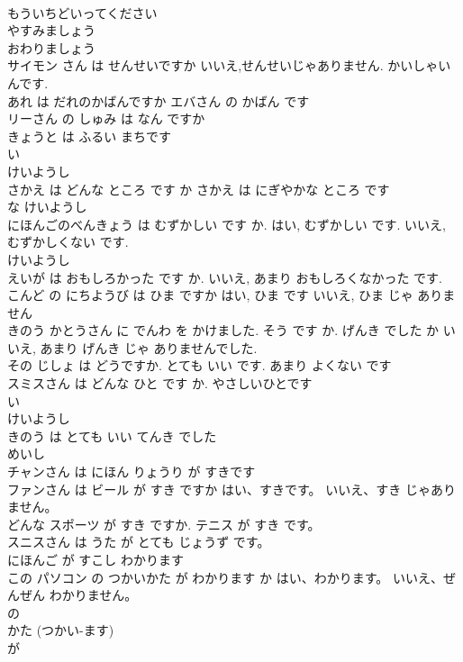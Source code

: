 \documentclass[8pt]{extreport}
\begin{document}
\begin{CJK}{UTF8}{min}
\\	もういちどいってください	
\\	やすみましょう	
\\	おわりましょう	
\\	サイモン さん は せんせいですか いいえ,せんせいじゃありません. かいしゃいんです.	
\\	あれ は だれのかばんですか エバさん の かばん です	
\\	リーさん の しゅみ は なん ですか	
\\	きょうと は ふるい まちです	
\\	い 
\\	けいようし 
\\	さかえ は どんな ところ です か さかえ は にぎやかな ところ です	
\\	な けいようし 
\\	にほんごのべんきょう は むずかしい です か. はい, むずかしい です. いいえ, むずかしくない です.	
\\	けいようし
\\	えいが は おもしろかった です か. いいえ, あまり おもしろくなかった です.	
\\	こんど の にちようび は ひま ですか はい, ひま です いいえ, ひま じゃ ありません	
\\	きのう かとうさん に でんわ を かけました. そう です か. げんき でした か いいえ, あまり げんき じゃ ありませんでした.	
\\	その じしょ は どうですか. とても いい です. あまり よくない です	
\\	スミスさん は どんな ひと です か. やさしいひとです	
\\	い 
\\	けいようし 
\\	きのう は とても いい てんき でした	
\\	めいし 
\\	チャンさん は にほん りょうり が すきです	
\\	ファンさん は ビール が すき ですか はい、すきです。 いいえ、すき じゃありません。	
\\	どんな スポーツ が すき ですか. テニス が すき です。	
\\	スニスさん は うた が とても じょうず です。	
\\	にほんご が すこし わかります	
\\	この パソコン の つかいかた が わかります か はい、わかります。 いいえ、ぜんぜん わかりません。	
\\	の 
\\	かた (つかい-ます) 
\\	が 

\end{CJK}
\end{document}
